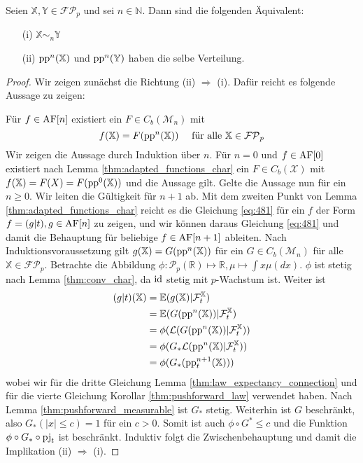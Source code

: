     \begin{lemma}\label{thm:equivalence_adapted_pp}
        Seien $\mathbb{X,Y} \in \mathcal{FP}_p$ und sei $n \in \mathbb{N}$. Dann sind die folgenden Äquivalent:
        \begin{enumerate}
            \item[(i)] $\mathbb{X} \sim_n \mathbb{Y}$
            \item[(ii)] $\operatorname{pp}^n(\mathbb{X})$ und $\operatorname{pp}^n(\mathbb{Y})$ haben die selbe Verteilung.
        \end{enumerate}
    \end{lemma}
    \begin{proof}
        Wir zeigen zunächst die Richtung (ii) $\Rightarrow$ (i). Dafür reicht es folgende Aussage zu zeigen:

        Für $f \in \operatorname{AF}[n]$ existiert ein $F \in C_b(\mathcal{M}_n)$ mit 
        \begin{equation}\label{eq:481}
            f(\mathbb{X}) = F(\operatorname{pp}^n(\mathbb{X})) \quad \text{ für alle } \mathbb{X} \in \mathcal{FP}_p
        \end{equation}
        Wir zeigen die Aussage durch Induktion über $n$. Für $n=0$ und $f \in \operatorname{AF}[0]$ existiert nach Lemma \ref{thm:adapted_functions_char} ein $F \in C_b(\mathcal{X})$ mit $f(\mathbb{X})=F(X)=F(\operatorname{pp}^0(\mathbb{X}))$ und die Aussage gilt. Gelte die Aussage nun für ein $n\geq 0$. Wir leiten die Gültigkeit für $n+1$ ab. Mit dem zweiten Punkt von Lemma \ref{thm:adapted_functions_char} reicht es die Gleichung \ref{eq:481} für ein $f$ der Form $f=(g\vert t), g\in \operatorname{AF}[n]$ zu zeigen, und wir können daraus Gleichung \ref{eq:481} und damit die Behauptung für beliebige $f \in \operatorname{AF}[n+1]$ ableiten. Nach Induktionsvoraussetzung gilt $g(\mathbb{X}) = G(\operatorname{pp}^n(\mathbb{X}))$ für ein $G \in C_b(\mathcal{M}_n)$ für alle $\mathbb{X}\in\mathcal{FP}_p$. Betrachte die Abbildung $\phi: \mathcal{P}_p(\mathbb{R}) \mapsto \mathbb{R}, \mu \mapsto \int x\mu(dx)$. $\phi$ ist stetig nach Lemma \ref{thm:conv_char}, da $\operatorname{id}$ stetig mit $p$-Wachstum ist. Weiter ist 
        \begin{align*}
            (g\vert t)(\mathbb{X}) &= \mathbb{E}(g(\mathbb{X}) \vert \mathcal{F}_t^\mathbb{X}) \\
            &= \mathbb{E}(G(\operatorname{pp}^n(\mathbb{X})) \vert \mathcal{F}_t^\mathbb{X}) \\
            &= \phi(\mathcal{L}(G(\operatorname{pp}^n(\mathbb{X})) \vert \mathcal{F}_t^\mathbb{X})) \\
            &= \phi(G_*\mathcal{L}(\operatorname{pp}^n(\mathbb{X}) \vert \mathcal{F}_t^\mathbb{X})) \\
            &= \phi(G_*(\operatorname{pp}^{n+1}_t(\mathbb{X})))
        \end{align*}
        wobei wir für die dritte Gleichung Lemma \ref{thm:law_expectancy_connection} und für die vierte Gleichung Korollar \ref{thm:pushforward_law} verwendet haben. Nach Lemma \ref{thm:pushforward_measurable} ist $G_*$ stetig. Weiterhin ist $G$ beschränkt, also $G_*(|x| \leq c)=1$ für ein $c>0$. Somit ist auch $\phi\circ G^* \leq c$ und die Funktion $\phi \circ G_* \circ \operatorname{pj}_t$ ist beschränkt. Induktiv folgt die Zwischenbehauptung und damit die Implikation (ii) $\Rightarrow$ (i).


\end{proof}
